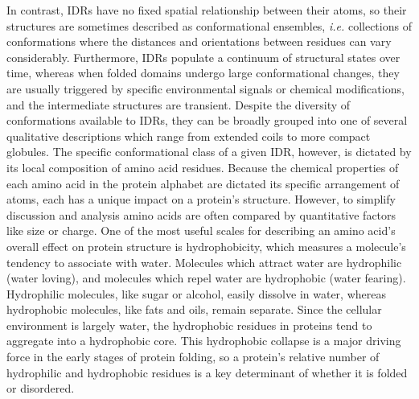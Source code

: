 In contrast, IDRs have no fixed spatial relationship between their atoms, so their structures are sometimes described as conformational ensembles, \textit{i.e.} collections of conformations where the distances and orientations between residues can vary considerably. Furthermore, IDRs populate a continuum of structural states over time, whereas when folded domains undergo large conformational changes, they are usually triggered by specific environmental signals or chemical modifications, and the intermediate structures are transient. Despite the diversity of conformations available to IDRs, they can be broadly grouped into one of several qualitative descriptions which range from extended coils to more compact globules. The specific conformational class of a given IDR, however, is dictated by its local composition of amino acid residues. Because the chemical properties of each amino acid in the protein alphabet are dictated its specific arrangement of atoms, each has a unique impact on a protein's structure. However, to simplify discussion and analysis amino acids are often compared by quantitative factors like size or charge. One of the most useful scales for describing an amino acid's overall effect on protein structure is hydrophobicity, which measures a molecule's tendency to associate with water. Molecules which attract water are hydrophilic (water loving), and molecules which repel water are hydrophobic (water fearing). Hydrophilic molecules, like sugar or alcohol, easily dissolve in water, whereas hydrophobic molecules, like fats and oils, remain separate. Since the cellular environment is largely water, the hydrophobic residues in proteins tend to aggregate into a hydrophobic core. This hydrophobic collapse is a major driving force in the early stages of protein folding, so a protein's relative number of hydrophilic and hydrophobic residues is a key determinant of whether it is folded or disordered.

